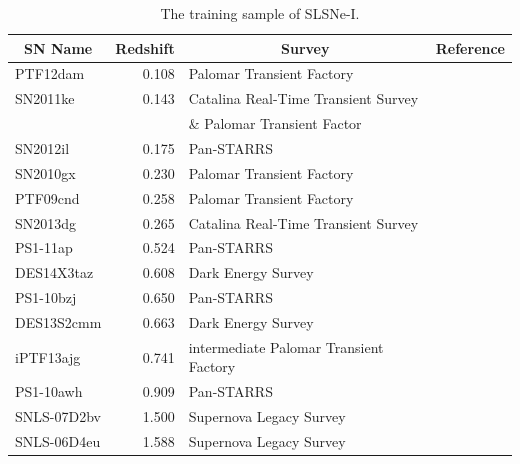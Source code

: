 \begin{table}
\begin{center}
  \caption{The training sample of SLSNe-I.}
\label{tab:PubishedSLSNe}
\begin{tabular}{|l|r|l|l|}
\hline
  \multicolumn{1}{|c|}{SN Name} &
  \multicolumn{1}{c|}{Redshift} &
  \multicolumn{1}{c|}{Survey} &
  \multicolumn{1}{c|}{Reference} \\
\hline
  PTF12dam & 0.108 & Palomar Transient Factory & \citet{Nicholl2013}\\
  SN2011ke & 0.143 & Catalina Real-Time Transient Survey & \citet{Inserra2013}\\
  &&\& Palomar Transient Factor & \\
  SN2012il & 0.175 & Pan-STARRS & \citet{Lunnan2013}\\
  SN2010gx & 0.230 & Palomar Transient Factory & \citet{Pastorello2010}\\
  PTF09cnd & 0.258 & Palomar Transient Factory & \citet{Quimby2011}\\
  SN2013dg & 0.265 & Catalina Real-Time Transient Survey & \citet{Nicholl2014} \\
  PS1-11ap & 0.524 & Pan-STARRS & \citet{McCrum2014a}\\
  DES14X3taz & 0.608 & Dark Energy Survey & \citet{Smith2016} \\
  PS1-10bzj & 0.650 & Pan-STARRS & \citet{Lunnan2013}\\
  DES13S2cmm & 0.663 & Dark Energy Survey & \citet{Papadopoulos2015} \\
  iPTF13ajg & 0.741 & intermediate Palomar Transient Factory &\citet{Vreeswijk2014}\\
  PS1-10awh & 0.909 & Pan-STARRS & \citet{Chomiuk2011}\\
  SNLS-07D2bv & 1.500 & Supernova Legacy Survey &\citet{Howell2013}\\
  SNLS-06D4eu & 1.588 & Supernova Legacy Survey &\citet{Howell2013}\\
\hline\end{tabular}
\end{center}
\end{table}
